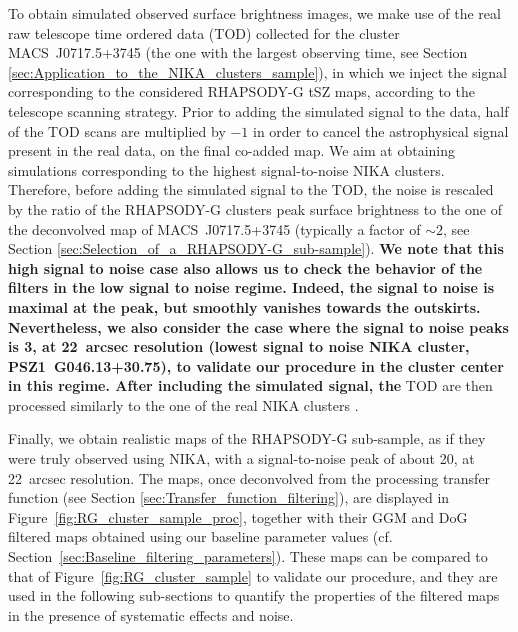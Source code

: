 \documentclass[twocolumn,traditabstract]{aa}
\begin{document}
To obtain simulated observed surface brightness images, we make use of the real raw telescope time ordered data (TOD) collected for the cluster \mbox{MACS~J0717.5+3745} (the one with the largest observing time, see Section \ref{sec:Application_to_the_NIKA_clusters_sample}), in which we inject the signal corresponding to the considered RHAPSODY-G tSZ maps, according to the telescope scanning strategy. Prior to adding the simulated signal to the data, half of the TOD scans are multiplied by $-1$ in order to cancel the astrophysical signal present in the real data, on the final co-added map. We aim at obtaining simulations corresponding to the highest signal-to-noise NIKA clusters. Therefore, before adding the simulated signal to the TOD, the noise is rescaled by the ratio of the RHAPSODY-G clusters peak surface brightness to the one of the deconvolved map of \mbox{MACS~J0717.5+3745} (typically a factor of $\sim 2$, see Section \ref{sec:Selection_of_a_RHAPSODY-G_sub-sample}). {\bf We note that this high signal to noise case also allows us to check the behavior of the filters in the low signal to noise regime. Indeed, the signal to noise is maximal at the peak, but smoothly vanishes towards the outskirts. Nevertheless, we also consider the case where the signal to noise peaks is 3, at 22~arcsec resolution (lowest signal to noise NIKA cluster, \mbox{PSZ1~G046.13+30.75}), to validate our procedure in the cluster center in this regime. After including the simulated signal, the} TOD are then processed similarly to the one of the real NIKA clusters \citep[see][for more details]{Adam2015}.

Finally, we obtain realistic maps of the RHAPSODY-G sub-sample, as if they were truly observed using NIKA, with a signal-to-noise peak of about 20, at 22~arcsec resolution. The maps, once deconvolved from the processing transfer function (see Section \ref{sec:Transfer_function_filtering}), are displayed in Figure~\ref{fig:RG_cluster_sample_proc}, together with their GGM and DoG filtered maps obtained using our baseline parameter values (cf. Section~\ref{sec:Baseline_filtering_parameters}). These maps can be compared to that of Figure~\ref{fig:RG_cluster_sample} to validate our procedure, and they are used in the following sub-sections to quantify the properties of the filtered maps in the presence of systematic effects and noise.

\end{document}
